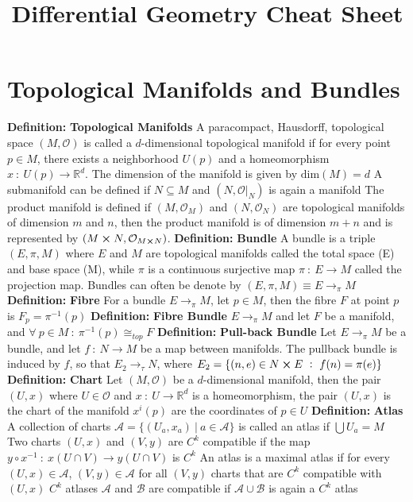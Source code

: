 \documentclass[14pt]{extarticle}
\title{Differential Geometry Cheat Sheet}
\def\Definition{{\color{blue} \textbf{Definition:} }}
\begin{document}
	\maketitle
	
	\section*{Topological Manifolds and Bundles}
	\begin{outline}		
		\1	\Definition \textbf{Topological Manifolds}
			\2	A paracompact, Hausdorff, topological space $(M,\mathcal{O})$ is
					called a $d$-dimensional topological manifold if for every point
					$p \in M$, there exists a neighborhood $U(p)$ and a homeomorphism
					$x~:~U(p) \rightarrow \mathbb{R}^d$.  The dimension of the manifold
					is given by $\text{dim}(M) = d$
			\2	A submanifold can be defined if $N \subseteq M$ and $(N,\mathcal{O}|_N)$
					is again a manifold
			\2	The product manifold is defined if $(M,\mathcal{O}_M)$ and 
					$(N,\mathcal{O}_N)$ are topological manifolds of dimension $m$ and
					$n$, then the product manifold is of dimension $m + n$ and
					is represented by $(M \cross N,\mathcal{O}_{M \cross N})$.
		\1	\Definition \textbf{Bundle}
			\2	A bundle is a triple $(E,\pi,M)$ where $E$ and $M$ are topological
					manifolds called the total space (E) and base space (M), while
					$\pi$ is a continuous surjective map $\pi~:~E \rightarrow M$ called
					the projection map.
			\2	Bundles can often be denote by $(E,\pi,M) \equiv E \rightarrow_{\pi} M$
		\1	\Definition \textbf{Fibre}
			\2	For a bundle $E \rightarrow_{\pi} M$, let $p \in M$, then
					the fibre $F$ at point $p$ is $F_p = \pi^{-1}(p)$
		\1	\Definition \textbf{Fibre Bundle}
			\2	$E \rightarrow_{\pi} M$ and let $F$ be a manifold,\\ 
					and $\forall~p \in M~:~\pi^{-1}(p) \cong_{top} F$
		\1	\Definition \textbf{Pull-back Bundle}
			\2	Let $E \rightarrow_{\pi} M$ be a bundle, and let $f~:~N \rightarrow M$
					be a map between manifolds.  The pullback bundle is induced by $f$, so
					that $E_2 \rightarrow_{\tau} N$, where $E_2 = \{(n,e) \in N \cross E~:~f(n) = \pi(e)\}$
		\1	\Definition \textbf{Chart}
			\2	Let $(M,\mathcal{O})$ be a $d$-dimensional manifold, then the pair
					$(U,x)$ where $U \in \mathcal{O}$ and $x~:~U \rightarrow \mathbb{R}^d$
					is a homeomorphism, the pair $(U,x)$ is the chart of the manifold
			\2	$x^i(p)$ are the coordinates of $p \in U$ 
		\1	\Definition \textbf{Atlas}
			\2	A collection of charts $\mathscr{A} = \{(U_a,x_a) ~|~a \in \mathcal{A}\}$
					is called an atlas if $\bigcup U_a = M$
			\2	Two charts $(U,x)$ and $(V,y)$ are $C^k$ compatible if
					the map $y \circ x^{-1}~:~x(U \cap V) \rightarrow y(U \cap V)$ is
					$C^k$
			\2	An atlas is a maximal atlas if for every $(U,x) \in \mathscr{A}$,
					$(V,y) \in \mathscr{A}$ for all $(V,y)$ charts that are $C^k$ 
					compatible with $(U,x)$
			\2	$C^k$ atlases $\mathscr{A}$ and $\mathscr{B}$ are compatible if
					$\mathscr{A} \cup \mathscr{B}$ is again a $C^k$ atlas

\end{outline}
\end{document}
